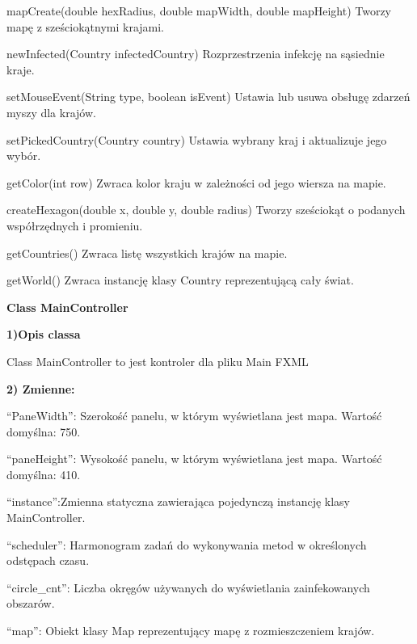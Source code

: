 \documentclass[a4paper]{article}
\begin{document}
\foreignlanguage{polish}{mapCreate(double hexRadius, double mapWidth, double mapHeight) Tworzy mapę z sześciokątnymi
krajami.}

\foreignlanguage{polish}{newInfected(Country infectedCountry) Rozprzestrzenia infekcję na sąsiednie kraje.}

\foreignlanguage{polish}{setMouseEvent(String type, boolean isEvent) Ustawia lub usuwa obsługę zdarzeń myszy dla
krajów.}

\foreignlanguage{polish}{setPickedCountry(Country country) Ustawia wybrany kraj i aktualizuje jego wybór.}

\foreignlanguage{polish}{getColor(int row) Zwraca kolor kraju w zależności od jego wiersza na mapie.}

\foreignlanguage{polish}{createHexagon(double x, double y, double radius) Tworzy sześciokąt o podanych współrzędnych i
promieniu.}

\foreignlanguage{polish}{getCountries() Zwraca listę wszystkich krajów na mapie.}

\foreignlanguage{polish}{getWorld() Zwraca instancję klasy Country reprezentującą cały świat.}


\bigskip


\bigskip

{\centering
\foreignlanguage{english}{\textbf{Class MainController}}
\par}
\vspace{6pt}
\foreignlanguage{english}{\textbf{1)Opis classa}}

\foreignlanguage{english}{Class MainController to jest kontroler dla pliku Main FXML}


\bigskip

\foreignlanguage{polish}{\textbf{2) Zmienne:}}

\foreignlanguage{polish}{“PaneWidth”: Szerokość panelu, w którym wyświetlana jest mapa. Wartość domyślna: 750.}

\foreignlanguage{polish}{“paneHeight”: Wysokość panelu, w którym wyświetlana jest mapa. Wartość domyślna: 410.}

\foreignlanguage{polish}{“instance”:Zmienna statyczna zawierająca pojedynczą instancję klasy MainController.}

\foreignlanguage{polish}{“scheduler”: Harmonogram zadań do wykonywania metod w określonych odstępach czasu.}

\foreignlanguage{polish}{“circle\_cnt”: Liczba okręgów używanych do wyświetlania zainfekowanych obszarów.}

\foreignlanguage{polish}{“map”: Obiekt klasy Map reprezentujący mapę z rozmieszczeniem krajów.}
\end{document}
